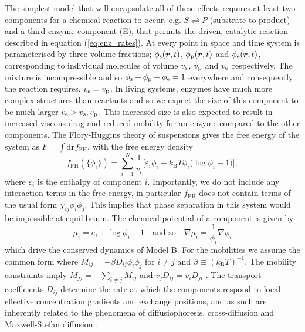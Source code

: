 The simplest model that will encapsulate all of these effects requires at least two components for a chemical reaction to occur, e.g. $S \rightleftharpoons P$ (substrate to product) and a third enzyme component (E), that permits the driven, catalytic reaction described in equation (\ref{eq:enz_rates}). At every point in space and time system is parameterised by three volume fractions; $\phi_{\mathrm{s}}(\bm{r},t)$, $\phi_{\mathrm{p}}(\bm{r},t)$ and $\phi_{\mathrm{e}}(\bm{r},t)$, corresponding to individual molecules of volume $v_{\mathrm{s}}$, $v_{\mathrm{p}}$ and $v_{\mathrm{e}}$ respectively. The mixture is incompressible and so $\phi_{\mathrm{s}}+\phi_{\mathrm{p}}+\phi_{\mathrm{e}}=1$ everywhere and consequently the reaction requires, $v_{\mathrm{s}} = v_{\mathrm{p}}$. In living systems, enzymes have much more complex structures than reactants and so we expect the size of this component to be much larger $v_{\mathrm{e}} > v_{\mathrm{s}}, v_{\mathrm{p}}$\cite{berg_biochemistry_2002}. This increased size is also expected to result in increased viscous drag and reduced mobility for an enzyme compared to the other components. The Flory-Huggins theory of suspensions gives the free energy of the system as $F = \int \mathrm{d}\bm{r} f_\mathrm{FH}$, with the free energy density
\begin{equation}
    f_\mathrm{FH}(\{\phi_i\}) = \sum_{i=1}^{N} \frac{1}{v_i} \big[\varepsilon_i\phi_i + k_\mathrm{B}T \phi_i \big(\log\phi_i-1\big) \big], 
    \label{eq:fh_gen}
\end{equation}
where $\varepsilon_i$ is the enthalpy of component $i$. Importantly, we do not include any interaction terms in the free energy, in particular $f_\mathrm{FH}$ does not contain terms of the usual form $\chi_{ij}\phi_i \phi_j$. This implies that phase separation in this system would be impossible at equilibrium. The chemical potential of a component is given by
\begin{equation}
    \mu_i = e_i + \log\phi_i + 1 \quad \text{and so} \quad \nabla\mu_i = \frac{1}{\phi_i}\nabla\phi_i
    \label{eq:chempot}
\end{equation}
which drive the conserved dynamics of Model B. For the mobilities we assume the common form where $M_{ij} = -\beta D_{ij}\phi_i\phi_j$ for $i \neq j$ and $\beta \equiv (k_\mathrm{B}T)^{-1}$. The mobility constraints imply $M_{jj}= - \sum_{i\neq j} M_{ij}$ and $v_j D_{ij} = v_i D_{ji}$ \cite{KRAMER1984473, kehr_mobility_1989, mao_designing_2020, bo_stochastic_2021}. The transport coefficients $D_{ij}$ determine the rate at which the components respond to local effective concentration gradients and exchange positions, and as such are inherently related to the phenomena of diffusiophoresis, cross-diffusion and Maxwell-Stefan diffusion \cite{suppmat}.

